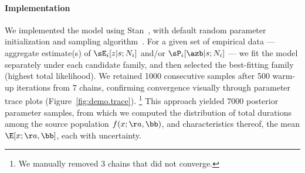 \paragraph{Implementation}
We implemented the model using Stan~\cite{Stan2024},
with default random parameter initialization and sampling algorithm~\cite{Betancourt2018}.
For a given set of empirical data
--- \ie aggregate estimate(s) of $\sE_i[z|s;N_i]$ and/or $\sP_i[\azb|s;N_i]$ ---
we fit the model separately under each candidate family,
and then selected the best-fitting family (highest total likelihood).
We retained 1000 consecutive samples after 500 warm-up iterations from 7 chains,
confirming convergence visually through parameter trace plots
(\eg Figure~\ref{fig:demo.trace}).%
\footnote{We manually removed 3 chains that did not converge.}
This approach yielded 7000 posterior parameter samples, from which we computed
the distribution of total durations among the source population $f(x;\aa,\bb)$,
and characteristics thereof, \eg the mean $\E[x;\aa,\bb]$,
each with uncertainty.
